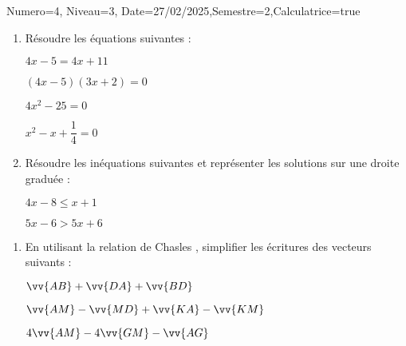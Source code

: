 \documentclass[a4paper,12pt]{article}
\begin{document}
\begin{Maquette}[DS]{Numero=4, Niveau=3, Date=27/02/2025,Semestre=2,Calculatrice=true}

\begin{exercice}
\begin{enumerate}
\item{} Résoudre les équations suivantes :
\begin{multicols}{4}
$4x-5=4x+11$ \newline
\anserline[6]
\columnbreak

$(4x-5)(3x+2)=0$\newline
\anserline[6]
\columnbreak

$4x^{2}-25=0$\newline
\anserline[6]
\columnbreak

$x^{2}-x+\dfrac{1}{4}=0$\newline
\anserline[6]
\end{multicols}
\item{} Résoudre les inéquations suivantes et représenter les solutions sur une droite graduée :
\begin{multicols}{2}
$4x-8\leq x+1$ \newline
\anserline[5]
\columnbreak

$5x-6 > 5x+6$\newline
\anserline[5]
\end{multicols}
\end{enumerate}
\end{exercice}

\begin{exercice}
\begin{enumerate}
\item{} En utilisant la relation de Chasles , simplifier les écritures des vecteurs suivants :
\begin{multicols}{3}
\(
\vv{AB}+\vv{DA}+\vv{BD}\)\newline
\anserline[4]
\columnbreak

\( \vv{AM}-\vv{MD}+\vv{KA}-\vv{KM}\)\newline
\anserline[4]
\columnbreak

\( 4\vv{AM}-4\vv{GM}-\vv{AG}\)\newline
\anserline[4]
\end{multicols}

\end{enumerate}
\end{exercice}


\end{Maquette}
\end{document}
